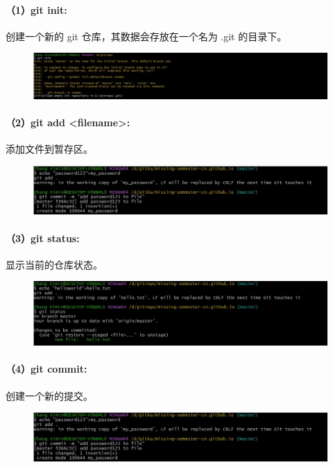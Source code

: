 \documentclass[a4paper, 12pt]{article}
\begin{document}
	\paragraph{（1）git init:}
	创建一个新的 git 仓库，其数据会存放在一个名为 .git 的目录下。
	
	\begin{figure}[H]
		\centering
		\includegraphics[width=1\textwidth]{015.jpg}
	\end{figure}
		
	\paragraph{（2）git add <filename>:}	
	添加文件到暂存区。
	
	\begin{figure}[H]
		\centering
		\includegraphics[width=1\textwidth]{017.jpg}
	\end{figure}	
		
	\paragraph{（3）git status:}	
	显示当前的仓库状态。
	
	\begin{figure}[H]
		\centering
		\includegraphics[width=1\textwidth]{016.jpg}
	\end{figure}
	
	\paragraph{（4）git commit:}	
	创建一个新的提交。
	
	\begin{figure}[H]
		\centering
		\includegraphics[width=1\textwidth]{017.jpg}
	\end{figure}
	
\end{document}

